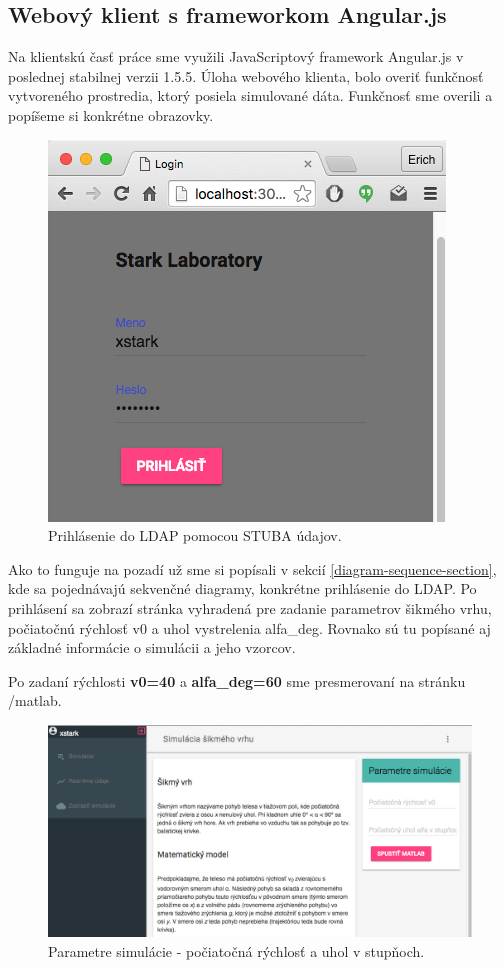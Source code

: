 \subsection{Webový klient s frameworkom Angular.js}\label{section-angular-web}
Na klientskú časť práce sme využili JavaScriptový framework Angular.js v poslednej stabilnej verzii 1.5.5. Úloha webového klienta, bolo overiť funkčnosť vytvoreného prostredia, ktorý posiela simulované dáta. Funkčnosť sme overili a popíšeme si konkrétne obrazovky.

\begin{figure}[H]
  \centering
  \includegraphics[scale=0.45]{img/code/angular-login.png}
  \caption{Prihlásenie do LDAP pomocou STUBA údajov.}
  \label{img-angular-login}
\end{figure}

Ako to funguje na pozadí už sme si popísali v sekcií \ref{diagram-sequence-section}, kde sa pojednávajú sekvenčné diagramy, konkrétne prihlásenie do LDAP.
Po prihlásení sa zobrazí stránka vyhradená pre zadanie parametrov šikmého vrhu, počiatočnú rýchlosť v0 a uhol vystrelenia alfa\_deg. Rovnako sú tu popísané aj základné informácie o simulácii a jeho vzorcov.

Po zadaní rýchlosti \textbf{v0=40} a \textbf{alfa\_deg=60} sme presmerovaní na stránku /matlab.

\begin{figure}[H]
  \centering
  \includegraphics[scale=0.42]{img/code/angular-simulation-param.png}
  \caption{Parametre simulácie - počiatočná rýchlosť a uhol v stupňoch.}
  \label{img-angular-params}
\end{figure}

